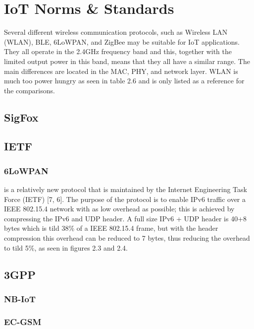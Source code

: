 \section{IoT Norms \& Standards}






Several different wireless communication protocols,
	such as Wireless LAN (WLAN),
	BLE, 6LoWPAN,
	and ZigBee may be suitable for IoT applications.
They all operate in the 2.4GHz frequency band and this,
	together with the limited output power in this band,
	means that they all have a similar range.
The main differences are located in the MAC,
	PHY,
	and network layer.
WLAN is much too power hungry as seen in table 2.6 and is only listed as a reference for the comparisons.

\subsection{SigFox}

\subsection{IETF}
\subsubsection{6LoWPAN} 
is a relatively new protocol that is maintained by the Internet
Engineering Task Force (IETF) [7, 6].
The purpose of the protocol is to enable IPv6 traffic over a IEEE 802.15.4 network with as low overhead as possible;
	this is achieved by compressing the IPv6 and UDP header.
A full size IPv6 + UDP header is 40+8 bytes which is tild 38\% of a IEEE 802.15.4
frame,
	but with the header compression this overhead can be reduced to 7 bytes,
	thus reducing the overhead to tild 5\%,
	as seen in figures 2.3 and 2.4.


\subsection{3GPP}
\subsubsection{NB-IoT}
\subsubsection{EC-GSM}
